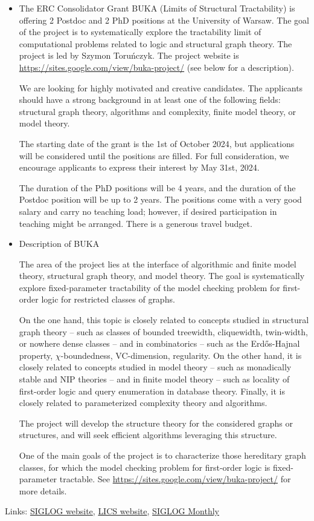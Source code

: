 \documentclass[prodmode,acmtecs]{acmsmall} %
\begin{document}
\begin{itemize}\item   The ERC Consolidator Grant BUKA (Limits of Structural Tractability) is offering 2 Postdoc and 2 PhD positions at the University of Warsaw. The goal of the project is to systematically explore the tractability limit of computational problems related to logic and structural graph theory. The project is led by Szymon Toruńczyk. The project website is \href{https://sites.google.com/view/buka-project/}{https://sites.google.com/view/buka-project/} (see below for a description). 
 
  We are looking for highly motivated and creative candidates. The applicants should have a strong background in at least one of the following fields: structural graph theory, algorithms and complexity, finite model theory, or model theory. 
 
  The starting date of the grant is the 1st of October 2024, but applications will be considered until the positions are filled. For full consideration, we encourage applicants to express their interest by May 31st, 2024.  
 
  The duration of the PhD positions will be 4 years, and the duration of the Postdoc position will be up to 2 years. The positions come with a very good salary and carry no teaching load; however, if desired participation in teaching might be arranged. There is a generous travel budget. 
 
\item  Description of BUKA  
 
  The area of the project lies at the interface of algorithmic and finite model theory, structural graph theory, and model theory. The goal is systematically explore fixed-parameter tractability of the model checking problem for first-order logic for restricted classes of graphs.  
 
  On the one hand, this topic is closely related to concepts studied in structural graph theory – such as classes of bounded treewidth, cliquewidth, twin-width, or nowhere dense classes – and in combinatorics – such as the Erdős-Hajnal property, $\chi$-boundedness, VC-dimension, regularity. On the other hand, it is closely related to concepts studied in model theory – such as monadically stable and NIP theories – and in finite model theory – such as locality of first-order logic and query enumeration in database theory. Finally, it is closely related to parameterized complexity theory and algorithms. 
 
  The project will develop the structure theory for the considered graphs or structures, and will seek efficient algorithms leveraging this structure. 
 
  One of the main goals of the project is to characterize those hereditary graph classes, for which the model checking problem for first-order logic is fixed-parameter tractable. See \href{https://sites.google.com/view/buka-project/}{https://sites.google.com/view/buka-project/} for more details.  
 
\end{itemize}


\bigskip Links: \href{http://siglog.org/}{SIGLOG website}, \href{https://lics.siglog.org}{LICS website}, \href{https://lics.siglog.org/newsletters/}{SIGLOG Monthly}
\end{document}
